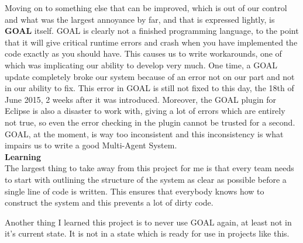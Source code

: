 Moving on to something else that can be improved, which is out of our control and what was the largest annoyance by far, and that is expressed lightly, is \textbf{GOAL} itself. GOAL is clearly not a finished programming language, to the point that it will give critical runtime errors and crash when you have implemented the code exactly as you should have. This causes us to write workarounds, one of which was implicating our ability to develop very much. One time, a GOAL update completely broke our system because of an error not on our part and not in our ability to fix. This error in GOAL is still not fixed to this day, the 18th of June 2015, 2 weeks after it was introduced. Moreover, the GOAL plugin for Eclipse is also a disaster to work with, giving a lot of errors which are entirely not true, so even the error checking in the plugin cannot be trusted for a second. GOAL, at the moment, is way too inconsistent and this inconsistency is what impairs us to write a good Multi-Agent System.
\\[2mm]\noindent
\textbf{Learning}\\
The largest thing to take away from this project for me is that every team needs to start with outlining the structure of the system as clear as possible before a single line of code is written. This ensures that everybody knows how to construct the system and this prevents a lot of dirty code.

Another thing I learned this project is to never use GOAL again, at least not in it's current state. It is not in a state which is ready for use in projects like this.